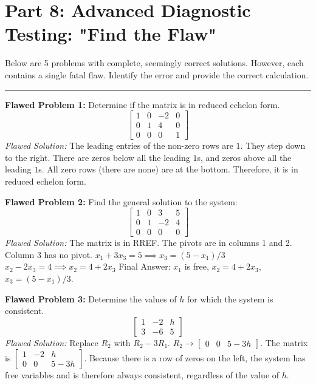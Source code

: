 \documentclass[11pt]{article}
\begin{document}
\newpage
\section{Part 8: Advanced Diagnostic Testing: "Find the Flaw"}

Below are 5 problems with complete, seemingly correct solutions. However, each contains a single fatal flaw. Identify the error and provide the correct calculation.

\hrule
\vspace{0.5cm}

\textbf{Flawed Problem 1:} Determine if the matrix is in reduced echelon form.
\[ \begin{bmatrix} 1 & 0 & -2 & 0 \\ 0 & 1 & 4 & 0 \\ 0 & 0 & 0 & 1 \end{bmatrix} \]
\textit{Flawed Solution:} The leading entries of the non-zero rows are $1$. They step down to the right. There are zeros below all the leading $1$s, and zeros above all the leading $1$s. All zero rows (there are none) are at the bottom. Therefore, it is in reduced echelon form.

\vspace{0.3cm}
\textbf{Flawed Problem 2:} Find the general solution to the system:
\[ \begin{bmatrix} 1 & 0 & 3 & 5 \\ 0 & 1 & -2 & 4 \\ 0 & 0 & 0 & 0 \end{bmatrix} \]
\textit{Flawed Solution:} 
The matrix is in RREF. The pivots are in columns 1 and 2. Column 3 has no pivot.
$x_1 + 3x_3 = 5 \implies x_3 = (5 - x_1)/3$
$x_2 - 2x_3 = 4 \implies x_2 = 4 + 2x_3$
Final Answer: $x_1$ is free, $x_2 = 4 + 2x_3$, $x_3 = (5 - x_1)/3$.

\vspace{0.3cm}
\textbf{Flawed Problem 3:} Determine the values of $h$ for which the system is consistent.
\[ \begin{bmatrix} 1 & -2 & h \\ 3 & -6 & 5 \end{bmatrix} \]
\textit{Flawed Solution:}
Replace $R_2$ with $R_2 - 3R_1$.
$R_2 \to \begin{bmatrix} 0 & 0 & 5 - 3h \end{bmatrix}$.
The matrix is $\begin{bmatrix} 1 & -2 & h \\ 0 & 0 & 5 - 3h \end{bmatrix}$.
Because there is a row of zeros on the left, the system has free variables and is therefore always consistent, regardless of the value of $h$.
\end{document}
